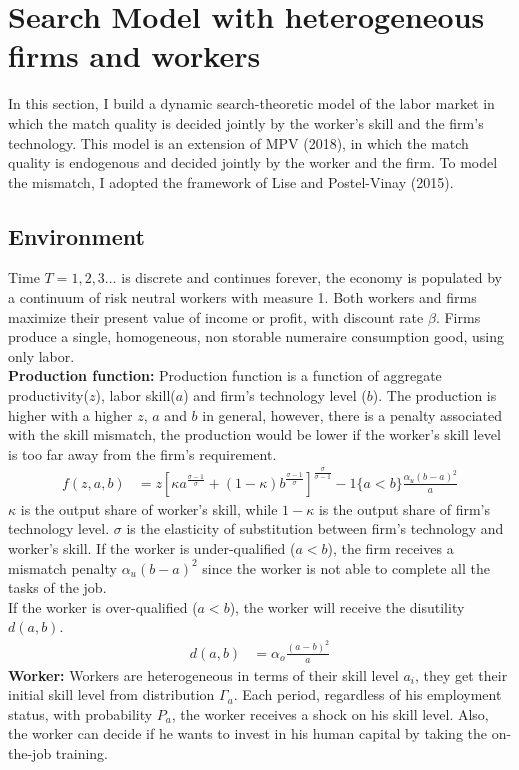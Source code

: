 \documentclass{article}
\newcommand{\1}{\mathbb{1}}
\begin{document}
\section{Search Model with heterogeneous firms and workers}
In this section, I build a dynamic search-theoretic model of the labor market in which the match quality is decided jointly by the worker's skill and the firm's technology. This model is an extension of MPV (2018)\cite{MPV2018}, in which the match quality is endogenous and decided jointly by the worker and the firm.
To model the mismatch, I adopted the framework of Lise and Postel-Vinay (2015)\cite{LisePostelVinay2015}. 

\subsection{Environment}
Time $T = 1, 2, 3 \dots$ is discrete and continues forever, the economy is populated by a continuum of risk neutral workers with measure 1. Both workers and firms maximize their present value of income or profit, with discount rate $\beta$. Firms produce a single, homogeneous, non storable numeraire consumption good, using only labor. \\

\textbf{Production function: }
Production function is a function of aggregate productivity($z$), labor skill($a$) and firm's technology level ($b$). The production is higher with a higher $z$, $a$ and $b$ in general, however, there is a penalty associated with the skill mismatch, the production would be lower if the worker's skill level is too far away from the firm's requirement. 
\begin{align*}
f(z,a,b) &= z[\kappa a^{\frac{\sigma-1}{\sigma}}+(1-\kappa) b^{\frac{\sigma-1}{\sigma}}]^{\frac{\sigma}{\sigma-1}}-1\{a<b\}\frac{\alpha_u(b-a)^2}{a}
\end{align*}
$\kappa$ is the output share of worker's skill, while $1-\kappa$ is the output share of firm's technology level.  $\sigma$ is the elasticity of substitution between firm's technology and worker's skill. If the worker is under-qualified ($a<b$), the firm receives a mismatch penalty $\alpha_u(b-a)^2$ since the worker is not able to complete all the tasks of the job. \\

If the worker is over-qualified ($a<b$), the worker will receive the disutility $d(a,b)$.  
\begin{align*}
d(a,b) &=\alpha_o\frac{(a-b)^2}{a}
\end{align*}
\textbf{Worker: }
Workers are heterogeneous in terms of their skill level $a_i$, they get their initial skill level from distribution $\Gamma_a$. 
Each period, regardless of his employment status, with probability $P_a$, the worker receives a shock on his skill level. 
Also, the worker can decide if he wants to invest in his human capital by taking the on-the-job training. \\
\end{document}
